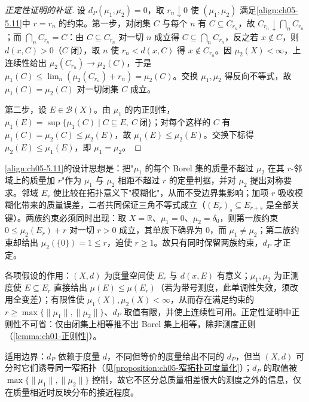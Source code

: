 \documentclass[../../main.tex]{subfiles}%
\begin{document}
\begin{proof}[正定性证明的补证]
设 $d_P(\mu_1,\mu_2)=0$，取 $r_n\downarrow0$ 使 $(\mu_1,\mu_2)$ 满足\eqref{align:ch05-5.11}中 $r=r_n$ 的约束。第一步，对闭集 $C$ 与每个 $n$ 有 $C\subseteq C_{r_n}$，故 $C_{r_n}\downarrow\bigcap_nC_{r_n}$；而 $\bigcap_nC_{r_n}=C$：由 $C\subseteq C_{r_n}$ 对一切 $n$ 成立得 $C\subseteq\bigcap_nC_{r_n}$，反之若 $x\notin C$，则 $d(x,C)>0$（$C$ 闭），取 $n$ 使 $r_n<d(x,C)$ 得 $x\notin C_{r_n}$。因 $\mu_2(X)<\infty$，上连续性给出 $\mu_2(C_{r_n})\to\mu_2(C)$，于是 $\mu_1(C)\leqslant\lim_n(\mu_2(C_{r_n})+r_n)=\mu_2(C)$。交换 $\mu_1,\mu_2$ 得反向不等式，故 $\mu_1(C)=\mu_2(C)$ 对一切闭集 $C$ 成立。

第二步，设 $E\in\mathscr{B}(X)$。由 $\mu_1$ 的内正则性，$\mu_1(E)=\sup\{\mu_1(C)\mid C\subseteq E,\ C\ \text{闭}\}$；对每个这样的 $C$ 有 $\mu_1(C)=\mu_2(C)\leqslant\mu_2(E)$，故 $\mu_1(E)\leqslant\mu_2(E)$。交换下标得 $\mu_2(E)\leqslant\mu_1(E)$，即 $\mu_1=\mu_2$。
\end{proof}

\begin{remark}\label{remark:ch05-Prokhorov度量动机}
\eqref{align:ch05-5.11}的设计思想是：把"$\mu_1$ 的每个 Borel 集的质量不超过 $\mu_2$ 在其 $r$-邻域上的质量加 $r$"作为 $\mu_1$ 与 $\mu_2$ 相距不超过 $r$ 的定量判据，并对 $\mu_2$ 提出对称要求。邻域 $E_r$ 使比较在拓扑意义下"模糊化"，从而不受边界集影响；加项 $r$ 吸收模糊化带来的质量误差，二者共同保证三角不等式成立（$(E_r)_s\subseteq E_{r+s}$ 是全部关键）。两族约束必须同时出现：取 $X=\mathbb{R}$、$\mu_1=0$、$\mu_2=\delta_0$，则第一族约束 $0\leqslant\mu_2(E_r)+r$ 对一切 $r>0$ 成立，其单族下确界为 $0$，而 $\mu_1\neq\mu_2$；第二族约束却给出 $\mu_2(\{0\})=1\leqslant r$，迫使 $r\geqslant1$。故只有同时保留两族约束，$d_P$ 才正定。

各项假设的作用：$(X,d)$ 为度量空间使 $E_r$ 与 $d(x,E)$ 有意义；$\mu_1,\mu_2$ 为正测度使 $E\subseteq E_r$ 直接给出 $\mu(E)\leqslant\mu(E_r)$（若为带号测度，此单调性失效，须改用全变差）；有限性使 $\mu_1(X),\mu_2(X)<\infty$，从而存在满足约束的 $r\geqslant\max\{\|\mu_1\|,\|\mu_2\|\}$、$d_P$ 取值有限，并使上连续性可用。正定性证明中正则性不可省：仅由闭集上相等推不出 Borel 集上相等，除非测度正则（\cref{lemma:ch01-正则性}）。

适用边界：$d_P$ 依赖于度量 $d$，不同但等价的度量给出不同的 $d_P$，但当 $(X,d)$ 可分时它们诱导同一窄拓扑（见\cref{proposition:ch05-窄拓扑可度量化}）；$d_P$ 的取值被 $\max\{\|\mu_1\|,\|\mu_2\|\}$ 控制，故它不区分总质量相差很大的测度之外的信息，仅在质量相近时反映分布的接近程度。
\end{remark}
\end{document}
